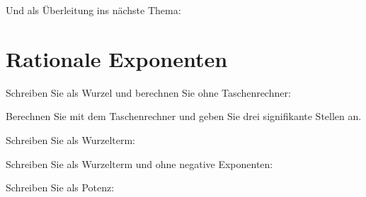 

\noTRAINER{\newpage}

\noTRAINER{\newpage}

Und als Überleitung ins nächste Thema:


\newpage
\section{Rationale Exponenten}

Schreiben Sie als Wurzel und berechnen Sie ohne Taschenrechner:


Berechnen Sie mit dem Taschenrechner und geben Sie drei signifikante
Stellen an.


\noTRAINER{\newpage}


Schreiben Sie als Wurzelterm:




\noTRAINER{\newpage}

\noTRAINER{\newpage}

Schreiben Sie als Wurzelterm und ohne negative Exponenten:




\noTRAINER{\newpage}

Schreiben Sie als Potenz:



